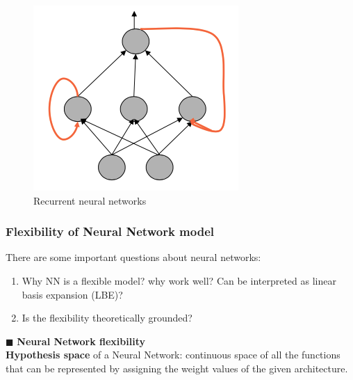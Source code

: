 \documentclass[../main.tex]{subfiles}
\begin{document}
\begin{figure}[H]
    \centering
    \includegraphics[scale = 0.4]{lectures/4_neural_networks/4_recurrent_nn.png}
    \caption{Recurrent neural networks}
    \label{fig:4_recurrent_nn}
\end{figure}


\subsubsection{Flexibility of Neural Network model}
There are some important questions about neural networks:
\begin{enumerate}
    \item Why NN is a flexible model? why work well? Can be interpreted as linear basis expansion (LBE)?
    \item Is the flexibility theoretically grounded?
\end{enumerate}

\noindent$\blacksquare$ \textbf{Neural Network flexibility}\\
\textbf{Hypothesis space} of a Neural Network: continuous space of all the functions that can be represented by assigning the weight values of the given architecture.
\end{document}
